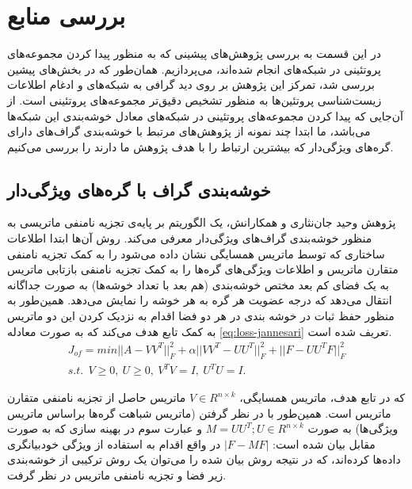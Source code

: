 \chapter{بررسی منابع}
در این قسمت به بررسی پژوهش‌های پیشینی که به منظور پیدا کردن مجموعه‌های پروتئینی در شبکه‌های  انجام شده‌اند، می‌پردازیم. همان‌طور که در بخش‌های پیشین بررسی شد، تمرکز این پژوهش بر روی دید گرافی به شبکه‌های  و ادغام اطلاعات زیست‌شناسی پروتئین‌ها به منظور تشخیص دقیق‌تر مجموعه‌های پروتئینی است. از آن‌جایی که پیدا کردن مجموعه‌های پروتئینی در شبکه‌های  معادل خوشه‌بندی این شبکه‌ها می‌باشد، ما ابتدا چند نمونه از پژوهش‌های مرتبط با خوشه‌بندی گراف‌های دارای گره‌‌های ویژگی‌دار که بیشترین ارتباط را با هدف پژوهش ما دارند را بررسی می‌کنیم. 

\section{‌‌خوشه‌بندی گراف‌ با گره‌های ویژ‌گی‌دار}
پژوهش وحید جان‌نثاری و همکارانش\cite{nonnegative}، یک الگوریتم بر پایه‌ی تجزیه نامنفی ماتریسی به منظور خوشه‌بندی گراف‌های ویژگی‌دار معرفی می‌کند. روش آن‌ها ابتدا اطلاعات ساختاری که توسط ماتریس همسایگی  نشان داده می‌شود را به کمک تجزیه نامنفی متقارن ماتریس  و اطلاعات ویژگی‌های گره‌ها را به کمک تجزیه نامنفی بازتابی ماتریس به یک فضای کم بعد مختص خوشه‌بندی (هم بعد با تعداد خوشه‌ها) به صورت جداگانه انتقال می‌دهد که درجه عضویت هر گره به هر خوشه را نمایش می‌دهد. همین‌طور به منظور حفظ ثبات در خوشه بندی در هر دو فضا اقدام به نزدیک کردن این دو ماتریس به کمک تابع هدف می‌کند که به صورت معادله \ref{eq:loss-jannesari} تعریف شده است.
\begin{gather}
    J_{of}=min||A-VV^{T}||_{F}^{2}+\alpha||VV^{T}-UU^{T}||_{F}^{2}+||F-UU^{T}F||_{F}^2 \\
    s.t.\:\: V\ge 0,\: U\ge 0,\:V^TV=I,\: U^TU=I.\nonumber  
    \label{eq:loss-jannesari}
\end{gather}

که در تابع هدف،  ماتریس همسایگی، $V\in R^{n\times k}$ ماتریس حاصل از تجزیه نامنفی متقارن ماتریس  است. همین‌طور با در نظر  گرفتن  (ماتریس شباهت  گره‌ها براساس ماتریس ویژگی‌ها) به صورت $M=UU^T;U\in R^{n\times k}$ و عبارت سوم در بهینه سازی که به صورت مقابل بیان شده است:  $|F-MF|$ در واقع اقدام به استفاده از ویژگی خودبیانگری  داده‌ها کرده‌اند، که در نتیجه روش بیان شده را می‌توان یک روش ترکیبی از خوشه‌بندی زیر فضا  و تجزیه نامنفی ماتریس در نظر گرفت.

